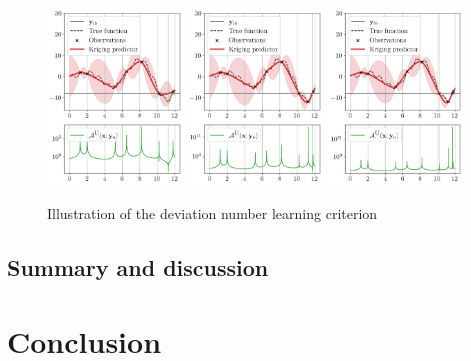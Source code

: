 \begin{figure}[ht]
    \centering
    \includegraphics[width=0.32\textwidth]{../numerical_experiments/chapter1/figures/contour_find_0.png}
    \includegraphics[width=0.32\textwidth]{../numerical_experiments/chapter1/figures/contour_find_1.png}
    \includegraphics[width=0.32\textwidth]{../numerical_experiments/chapter1/figures/contour_find_2.png}
    \caption{Illustration of the deviation number learning criterion}
    \label{fig:AK_1D}
\end{figure}

\subsection{Summary and discussion}





\section{Conclusion}


